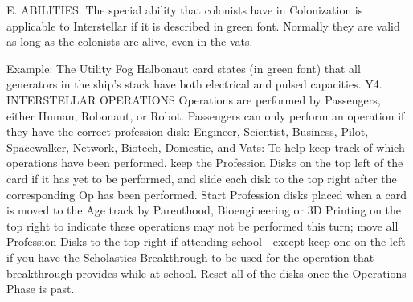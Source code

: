 \documentclass[a4paper]{book}
\begin{document}
E. ABILITIES. The special ability that colonists have in Colonization is applicable to Interstellar if it is described in green font. Normally they are valid as long as the colonists are alive, even in the vats.
 
Example: The Utility Fog Halbonaut card states (in green font) that all generators in the ship’s stack have both electrical and pulsed capacities.
Y4. INTERSTELLAR OPERATIONS
Operations are performed by Passengers, either Human, Robonaut, or Robot. Passengers can only perform an operation if they have the correct profession disk: Engineer, Scientist, Business, Pilot, Spacewalker, Network, Biotech, Domestic, and Vats:
To help keep track of which operations have been performed, keep the Profession Disks on the top left of the card if it has yet to be performed, and slide each disk to the top right after the corresponding Op has been performed. Start Profession disks placed when a card is moved to the Age track by Parenthood, Bioengineering or 3D Printing on the top right to indicate these operations may not be performed this turn; move all Profession Disks to the top right if attending school - except keep one on the left if you have the Scholastics Breakthrough to be used for the operation that breakthrough provides while at school. Reset all of the disks once the Operations Phase is past.
 
\end{document}
